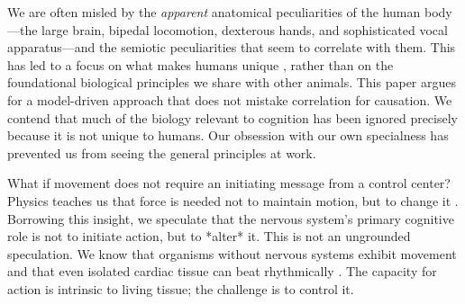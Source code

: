 We are often misled by the \textit{apparent} anatomical peculiarities of the human body—the large brain, bipedal locomotion, dexterous hands, and sophisticated vocal apparatus—and the semiotic peculiarities that seem to correlate with them. This has led to a focus on what makes humans unique \cite{hauser2002uniquely}, rather than on the foundational biological principles we share with other animals. This paper argues for a model-driven approach that does not mistake correlation for causation. We contend that much of the biology relevant to cognition has been ignored precisely because it is not unique to humans. Our obsession with our own specialness has prevented us from seeing the general principles at work.

What if movement does not require an initiating message from a control center? Physics teaches us that force is needed not to maintain motion, but to change it \cite{newton1687principia}. Borrowing this insight, we speculate that the nervous system's primary cognitive role is not to initiate action, but to *alter* it. This is not an ungrounded speculation. We know that organisms without nervous systems exhibit movement and that even isolated cardiac tissue can beat rhythmically \citep{llinas2002vortex, landecker2007culturing}. The capacity for action is intrinsic to living tissue; the challenge is to control it.

